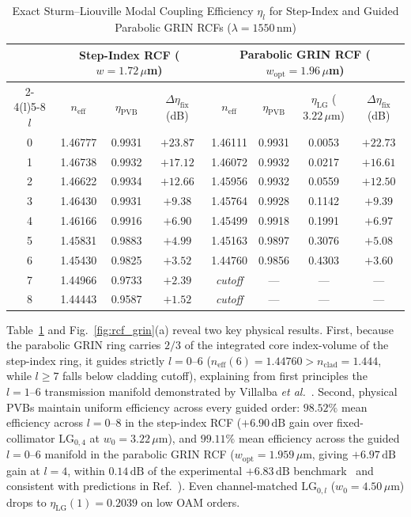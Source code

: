 \documentclass{optica-article}
\begin{document}
\begin{table}[htbp]
  \centering
  \caption{Exact Sturm--Liouville Modal Coupling Efficiency $\eta_l$ for Step-Index and Guided Parabolic GRIN RCFs ($\lambda = 1550\,\mathrm{nm}$)}
  \label{tab:rcf_grin}
  \scriptsize
  \renewcommand{\arraystretch}{1.14}
  \begin{tabular}{@{}cccc@{\hspace{1.2em}}cccc@{}}
  \toprule
  & \multicolumn{3}{c}{\textbf{Step-Index RCF ($w = 1.72\,\mu$m)}} & \multicolumn{4}{c}{\textbf{Parabolic GRIN RCF ($w_{\mathrm{opt}} = 1.96\,\mu$m)}} \\
  \cmidrule(r){2-4}\cmidrule(l){5-8}
  $l$ & $n_{\mathrm{eff}}$ & $\eta_{\mathrm{PVB}}$ & $\Delta\eta_{\mathrm{fix}}$ (dB) & $n_{\mathrm{eff}}$ & $\eta_{\mathrm{PVB}}$ & $\eta_{\mathrm{LG}}$ ($3.22\,\mu$m) & $\Delta\eta_{\mathrm{fix}}$ (dB) \\
  \midrule
  0 & 1.46777 & 0.9931 & $+23.87$ & 1.46111 & 0.9931 & 0.0053 & $+22.73$ \\
  1 & 1.46738 & 0.9932 & $+17.12$ & 1.46072 & 0.9932 & 0.0217 & $+16.61$ \\
  2 & 1.46622 & 0.9934 & $+12.66$ & 1.45956 & 0.9932 & 0.0559 & $+12.50$ \\
  3 & 1.46430 & 0.9931 & $+9.38$ & 1.45764 & 0.9928 & 0.1142 & $+9.39$ \\
  4 & 1.46166 & 0.9916 & $+6.90$ & 1.45499 & 0.9918 & 0.1991 & $+6.97$ \\
  5 & 1.45831 & 0.9883 & $+4.99$ & 1.45163 & 0.9897 & 0.3076 & $+5.08$ \\
  6 & 1.45430 & 0.9825 & $+3.52$ & 1.44760 & 0.9856 & 0.4303 & $+3.60$ \\
  7 & 1.44966 & 0.9733 & $+2.39$ & \emph{cutoff} & --- & --- & --- \\
  8 & 1.44443 & 0.9587 & $+1.52$ & \emph{cutoff} & --- & --- & --- \\
  \bottomrule
  \end{tabular}
\end{table}

Table~\ref{tab:rcf_grin} and Fig.~\ref{fig:rcf_grin}(a) reveal two key physical results. First, because the parabolic GRIN ring carries $2/3$ of the integrated core index-volume of the step-index ring, it guides strictly $l = 0\text{--}6$ ($n_{\mathrm{eff}}(6) = 1.44760 > n_{\mathrm{clad}} = 1.444$, while $l \ge 7$ falls below cladding cutoff), explaining from first principles the $l = 1\text{--}6$ transmission manifold demonstrated by Villalba \emph{et al.}~\cite{Villalba2023}. Second, physical PVBs maintain uniform efficiency across every guided order: $98.52\%$ mean efficiency across $l = 0\text{--}8$ in the step-index RCF ($+6.90\,\mathrm{dB}$ gain over fixed-collimator $\mathrm{LG}_{0,4}$ at $w_0 = 3.22\,\mu\mathrm{m}$), and $99.11\%$ mean efficiency across the guided $l = 0\text{--}6$ manifold in the parabolic GRIN RCF ($w_{\mathrm{opt}} = 1.959\,\mu\mathrm{m}$, giving $+6.97\,\mathrm{dB}$ gain at $l = 4$, within $0.14\,\mathrm{dB}$ of the experimental $+6.83\,\mathrm{dB}$ benchmark~\cite{Villalba2023} and consistent with predictions in Ref.~\cite{RojasRojas2021}). Even channel-matched $\mathrm{LG}_{0,l}$ ($w_0 = 4.50\,\mu\mathrm{m}$) drops to $\eta_{\mathrm{LG}}(1) = 0.2039$ on low OAM orders.
\end{document}

